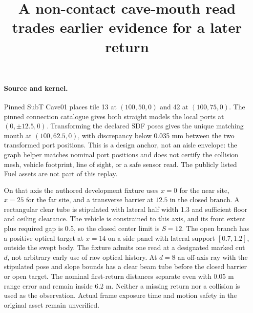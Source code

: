 \documentclass{article}
\begin{document}
\title{A non-contact cave-mouth read trades earlier evidence for a later return}
\maketitle

\paragraph{Source and kernel.}
Pinned SubT Cave01 places tile 13 at \((100,50,0)\) and 42
at \((100,75,0)\). The pinned connection catalogue gives both
straight models the local ports at \((0,\pm12.5,0)\).
Transforming the declared SDF poses gives the unique matching
mouth at \((100,62.5,0)\), with discrepancy below 0.035 mm
between the two transformed port positions. This is a design
anchor, not an aisle envelope: the graph helper matches
nominal port positions and does not certify the collision mesh,
vehicle footprint, line of sight, or a safe sensor read.
The publicly listed Fuel assets are not part of this replay.

On that axis the authored development fixture uses \(x=0\)
for the near site, \(x=25\) for the far site, and a transverse
barrier at \(12.5\) in the closed branch. A rectangular clear
tube is stipulated with lateral half width 1.3 and sufficient
floor and ceiling clearance. The vehicle is constrained to
this axis, and its front extent plus required gap is 0.5, so
the closed center limit is \(S=12\). The open branch has
a positive optical target at \(x=14\) on a side panel
with lateral support \([0.7,1.2]\), outside the swept body.
The fixture admits one read at a designated marked cut \(d\),
not arbitrary early use of raw optical history. At \(d=8\)
an off-axis ray with the stipulated pose and slope bounds
has a clear beam tube before the closed barrier or open target.
The nominal first-return distances separate even with
0.05 m range error and remain inside 6.2 m.
Neither a missing return nor a collision is used as the
observation. Actual frame exposure time and motion safety in
the original asset remain unverified.
\end{document}
